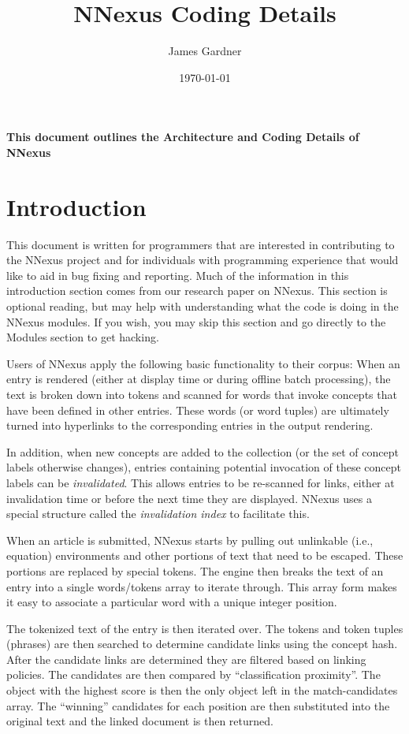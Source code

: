 \documentclass{article}
\author{James Gardner}
\date{\today}
\title{NNexus Coding Details}
\begin{document}
\maketitle

{\bf This document outlines the Architecture and Coding Details of NNexus}

\section{Introduction}
This document is written for programmers that are interested in contributing
to the NNexus project and for individuals with programming experience that
would like to aid in bug fixing and reporting. Much of the information in this
introduction section comes from our research paper on NNexus. This section
is optional reading, but may help with understanding what the code is doing
in the NNexus modules. If you wish, you may skip this section and go
directly to the Modules section to get hacking.

Users of NNexus apply the following basic functionality to their corpus:  When an entry is rendered (either at display time or during offline batch processing), the text is broken down into tokens and scanned for words that invoke concepts that have been defined in other entries.  These words (or word tuples) are ultimately turned into hyperlinks to the corresponding entries in the output rendering.

In addition, when new concepts are added to the collection (or the set of concept labels otherwise changes), entries containing potential invocation of these concept labels can be \emph{invalidated}.  This allows entries to be re-scanned for links, either at invalidation time or before the next time they are displayed.
NNexus uses a special structure called the \emph{invalidation index} to facilitate this.

When an article is submitted, NNexus starts by pulling out unlinkable (i.e., equation) environments and other portions of text that need to be escaped.  These portions are replaced by special tokens.  The engine then breaks the text of an entry into a single words/tokens array to iterate through.  This array form makes it easy to associate a particular word with a unique integer position.  

The tokenized text of the entry is then iterated over. The tokens and token tuples (phrases) are then searched to determine candidate links using the concept hash. After the candidate links are determined they are filtered based on linking policies.  The candidates are then compared by ``classification proximity''. The object with the highest score is then the only object left in the match-candidates array. The ``winning'' candidates for each position are then substituted into the original text and the linked document is then returned.
\end{document}
